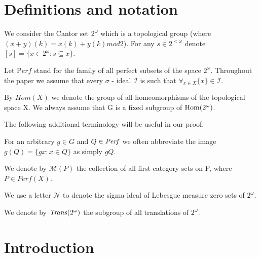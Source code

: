 \documentclass[b5cutpaper, twoside, 11pt, leqno]{moravica}
\newcommand\trans{{\it Trans}(\ca)}
\newcommand{\seq}{\subseteq}
\newcommand{\ca}{2^{\omega}}
\newcommand{\mgr}{{\mathcal M}}
\newcommand{\neglig}{{\mathcal N}}
\newcommand{\oo}{\omega}
\newcommand{\real}{\bf R}
\newcommand{\perf}{{\it Perf}}
\newcommand{\cantor}{\ca}
\newcommand{\Perf}{{\mathrm Perf}}
\newcommand{\calI}{{\mathcal{I}}}
\newcommand\Hom{{\rm Hom(\ca)}}
\theoremstyle{definition}
\begin{document}


\section{Definitions and notation} 

We consider the Cantor set $2^\omega$ 
which is a topological group (where 
$(x+y)(k) = x(k) + y(k) \mathit{mod} 2$).
For any $s\in 2^{<\omega}$ denote 
$[s] = \{x\in\cantor\colon s \subseteq x\}$.

Let $\Perf$ stand for the family of all perfect subsets of the space
$2^\omega$.
  Throughout the paper we assume that every $\sigma$ - ideal
$\calI$ is such that
  $\forall_{x\in X} \lbrace x \rbrace \in \calI$.


  By $Hom(X)$ we denote the group of all homeomorphisms of the
topological space X.
  We always assume that G is a fixed subgroup of $\Hom$.

The following additional terminology will be useful in our proof.

  For an arbitrary $g\in G$ and $Q \in \perf$
we often abbreviate the image $g(Q) = \lbrace gx: x\in Q \rbrace$
as simply $gQ$.

  We denote by $\mgr(P)$ the collection of all
first category sets on P, where $P \in Perf(X)$.

  We use a letter $\neglig$ to denote
the sigma ideal of Lebesgue measure zero sets of $2^\omega$.

  We denote by $\trans$ the subgroup of all
translations of $\cantor$. 

\section{Introduction} 
\end{document}
